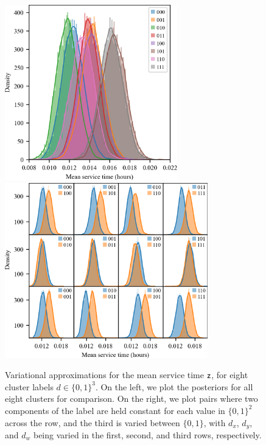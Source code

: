 \begin{figure}[htb!]
    \centering
    \includegraphics[height=3.0in]{media/q_phi_nsf_730_all.png}
    \includegraphics[height=3.0in]{media/q_phi_nsf_730_grid.png}
    \caption{Variational approximations for the mean service time $\mathsf z$, for eight cluster labels $d\in\{0,1\}^3$. On the left, we plot the posteriors for all eight clusters for comparison. On the right, we plot pairs where two components of the label are held constant for each value in $\{0,1\}^2$ across the row, and the third is varied between $\{0,1\}$, with $d_x$, $d_y$, and $d_w$ being varied in the first, second, and third rows, respectively.}
    \label{fig:q-phi-combined}
\end{figure}


